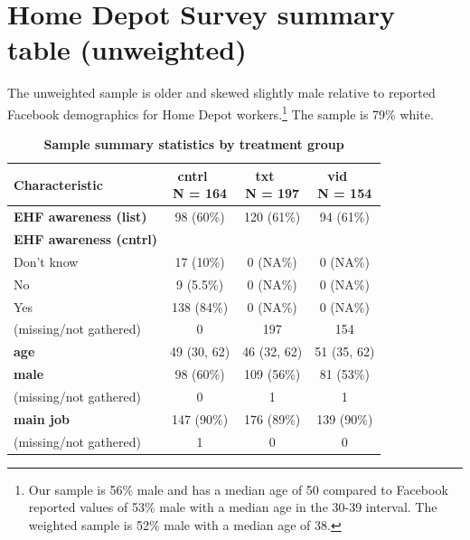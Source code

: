 \documentclass[
  11pt,
  oneside]{article}
\begin{document}
\section{Home Depot Survey summary table (unweighted)}\label{app-survsum-uw}

The unweighted sample is older and skewed slightly male relative to reported Facebook demographics for Home Depot workers.\footnote{Our sample is 56\% male and has a median age of 50 compared to Facebook reported values of 53\% male with a median age in the 30-39 interval. The weighted sample is 52\% male with a median age of 38.} The sample is 79\% white.

\begin{table}

\caption{\label{tab:tab-sum-uw}\textbf{Sample summary statistics by treatment group}}
\centering
\begin{tabular}[t]{l|c|c|c}
\hline
\textbf{Characteristic} & \makecell[c]{\textbf{cntrl}\ \ \\N = 164} & \makecell[c]{\textbf{txt}\ \ \\N = 197} & \makecell[c]{\textbf{vid}\ \ \\N = 154}\\
\hline
\textbf{EHF awareness (list)} & 98 (60\%) & 120 (61\%) & 94 (61\%)\\
\hline
\textbf{EHF awareness (cntrl)} &  &  & \\
\hline
\hspace{1em}Don’t know & 17 (10\%) & 0 (NA\%) & 0 (NA\%)\\
\hline
\hspace{1em}No & 9 (5.5\%) & 0 (NA\%) & 0 (NA\%)\\
\hline
\hspace{1em}Yes & 138 (84\%) & 0 (NA\%) & 0 (NA\%)\\
\hline
\hspace{1em}(missing/not gathered) & 0 & 197 & 154\\
\hline
\textbf{age} & 49 (30, 62) & 46 (32, 62) & 51 (35, 62)\\
\hline
\textbf{male} & 98 (60\%) & 109 (56\%) & 81 (53\%)\\
\hline
\hspace{1em}(missing/not gathered) & 0 & 1 & 1\\
\hline
\textbf{main job} & 147 (90\%) & 176 (89\%) & 139 (90\%)\\
\hline
\hspace{1em}(missing/not gathered) & 1 & 0 & \vphantom{1} 0\\

\end{tabular}
\end{table}
\end{document}
